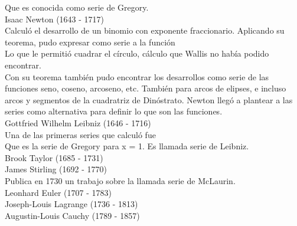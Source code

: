 \documentclass[a4paper, 11pt]{article}
\begin{document}
Que es conocida como serie de Gregory.\\


Isaac Newton (1643 - 1717)\\
Calculó el desarrollo de un binomio con exponente fraccionario.
Aplicando su teorema, pudo expresar como serie a la función \\



Lo que le permitió cuadrar el círculo, cálculo que Wallis no había podido encontrar.\\
Con su teorema también pudo encontrar los desarrollos como serie de las funciones seno, coseno, arcoseno, etc. También para arcos de elipses, e incluso arcos y segmentos de la cuadratriz de Dinóstrato.
Newton llegó a plantear a las series como alternativa para definir lo que son las funciones.\\

Gottfried Wilhelm Leibniz (1646 - 1716)\\
Una de las primeras series que calculó fue\\



Que es la serie de Gregory para x = 1. Es llamada serie de Leibniz.\\

Brook Taylor (1685 - 1731)\\

James Stirling (1692 - 1770)\\
Publica en 1730 un trabajo sobre la llamada serie de McLaurin.\\

Leonhard Euler (1707 - 1783)\\

Joseph-Louis Lagrange (1736 - 1813)\\



Augustin-Louis Cauchy (1789 - 1857)\\
\end{document}
